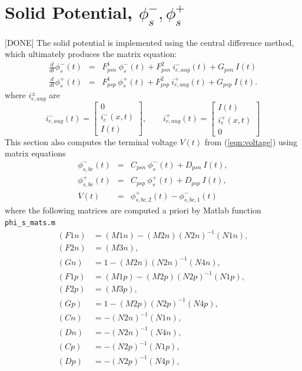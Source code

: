 \documentclass[12pt]{article}
\begin{document}
\section{Solid Potential, $\phi_{s}^{-}, \phi_{s}^{+}$}\label{sec:phis}
[DONE] The solid potential is implemented using the central difference method, which ultimately produces the matrix equation:
\begin{eqnarray}
	\frac{d}{dt} \phi_{s}^{-}(t) &=& F^{1}_{psn} \ \phi_{s}^{-}(t) + F^{2}_{psn} \ i_{e,aug}^{-}(t) + G_{psn} \ I(t) \\
	\frac{d}{dt} \phi_{s}^{+}(t) &=& F^{1}_{psp} \ \phi_{s}^{+}(t) + F^{2}_{psp} \ i_{e,aug}^{+}(t) + G_{psp} \ I(t).
\end{eqnarray}
where $i_{e,aug}^{\pm}$ are 
\begin{equation}\label{eqn:i_ex}
i_{e,aug}^{-}(t) = 
\left[
\begin{array}{c}
  0 \\
  i_{e}^{-}(x,t) \\
  I(t)
\end{array}
\right], \qquad
i_{e,aug}^{+}(t) = 
\left[
\begin{array}{c}
  I(t) \\
  i_{e}^{+}(x,t) \\
  0
\end{array}
\right]
\end{equation}
This section also computes the terminal voltage $V(t)$ from (\ref{eqn:voltage}) using matrix equations
\begin{eqnarray}
	\phi_{s,bc}^{-}(t) &=& C_{psn} \ \phi_{s}^{-}(t) + D_{psn} \ I(t), \\
	\phi_{s,bc}^{+}(t) &=& C_{psp} \ \phi_{s}^{+}(t) + D_{psp} \ I(t), \\
	V(t) &=& \phi_{s,bc,2}^{+}(t) - \phi_{s,bc,1}^{-}(t)
\end{eqnarray}
where the following matrices are computed a priori by Matlab function \texttt{phi\_s\_mats.m}
\begin{align}
	(F1n) &= (M1n) - (M2n) (N2n)^{-1} (N1n), \\
	(F2n) &= (M3n), \\
	(Gn) &= 1 - (M2n) (N2n)^{-1} (N4n), \\
	(F1p) &= (M1p) - (M2p)(N2p)^{-1}(N1p), \\
	(F2p) &= (M3p), \\
	(Gp) &= 1 - (M2p)(N2p)^{-1}(N4p), \\
	(Cn) &= -(N2n)^{-1}(N1n), \\
	(Dn) &= -(N2n)^{-1}(N4n), \\
	(Cp) &= -(N2p)^{-1}(N1p), \\
	(Dp) &= -(N2p)^{-1}(N4p),
\end{align}
\end{document}
